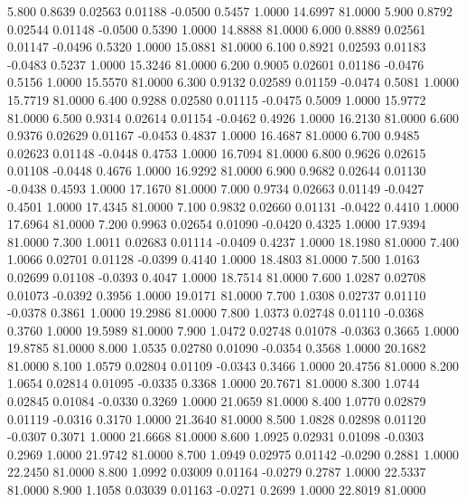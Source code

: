    5.800   0.8639   0.02563   0.01188  -0.0500   0.5457   1.0000  14.6997  81.0000
   5.900   0.8792   0.02544   0.01148  -0.0500   0.5390   1.0000  14.8888  81.0000
   6.000   0.8889   0.02561   0.01147  -0.0496   0.5320   1.0000  15.0881  81.0000
   6.100   0.8921   0.02593   0.01183  -0.0483   0.5237   1.0000  15.3246  81.0000
   6.200   0.9005   0.02601   0.01186  -0.0476   0.5156   1.0000  15.5570  81.0000
   6.300   0.9132   0.02589   0.01159  -0.0474   0.5081   1.0000  15.7719  81.0000
   6.400   0.9288   0.02580   0.01115  -0.0475   0.5009   1.0000  15.9772  81.0000
   6.500   0.9314   0.02614   0.01154  -0.0462   0.4926   1.0000  16.2130  81.0000
   6.600   0.9376   0.02629   0.01167  -0.0453   0.4837   1.0000  16.4687  81.0000
   6.700   0.9485   0.02623   0.01148  -0.0448   0.4753   1.0000  16.7094  81.0000
   6.800   0.9626   0.02615   0.01108  -0.0448   0.4676   1.0000  16.9292  81.0000
   6.900   0.9682   0.02644   0.01130  -0.0438   0.4593   1.0000  17.1670  81.0000
   7.000   0.9734   0.02663   0.01149  -0.0427   0.4501   1.0000  17.4345  81.0000
   7.100   0.9832   0.02660   0.01131  -0.0422   0.4410   1.0000  17.6964  81.0000
   7.200   0.9963   0.02654   0.01090  -0.0420   0.4325   1.0000  17.9394  81.0000
   7.300   1.0011   0.02683   0.01114  -0.0409   0.4237   1.0000  18.1980  81.0000
   7.400   1.0066   0.02701   0.01128  -0.0399   0.4140   1.0000  18.4803  81.0000
   7.500   1.0163   0.02699   0.01108  -0.0393   0.4047   1.0000  18.7514  81.0000
   7.600   1.0287   0.02708   0.01073  -0.0392   0.3956   1.0000  19.0171  81.0000
   7.700   1.0308   0.02737   0.01110  -0.0378   0.3861   1.0000  19.2986  81.0000
   7.800   1.0373   0.02748   0.01110  -0.0368   0.3760   1.0000  19.5989  81.0000
   7.900   1.0472   0.02748   0.01078  -0.0363   0.3665   1.0000  19.8785  81.0000
   8.000   1.0535   0.02780   0.01090  -0.0354   0.3568   1.0000  20.1682  81.0000
   8.100   1.0579   0.02804   0.01109  -0.0343   0.3466   1.0000  20.4756  81.0000
   8.200   1.0654   0.02814   0.01095  -0.0335   0.3368   1.0000  20.7671  81.0000
   8.300   1.0744   0.02845   0.01084  -0.0330   0.3269   1.0000  21.0659  81.0000
   8.400   1.0770   0.02879   0.01119  -0.0316   0.3170   1.0000  21.3640  81.0000
   8.500   1.0828   0.02898   0.01120  -0.0307   0.3071   1.0000  21.6668  81.0000
   8.600   1.0925   0.02931   0.01098  -0.0303   0.2969   1.0000  21.9742  81.0000
   8.700   1.0949   0.02975   0.01142  -0.0290   0.2881   1.0000  22.2450  81.0000
   8.800   1.0992   0.03009   0.01164  -0.0279   0.2787   1.0000  22.5337  81.0000
   8.900   1.1058   0.03039   0.01163  -0.0271   0.2699   1.0000  22.8019  81.0000
